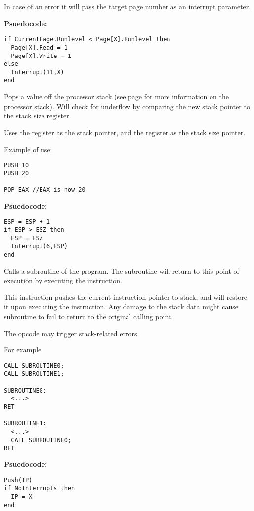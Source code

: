 
\intrpriv

In case of an error it will pass the target page number as an interrupt parameter.

\textbf{Psuedocode:}
\begin{verbatim}
if CurrentPage.Runlevel < Page[X].Runlevel then
  Page[X].Read = 1
  Page[X].Write = 1
else
  Interrupt(11,X)
end
\end{verbatim}


Pops a value off the processor stack (see page \pageref{stack} for more information on the processor stack). Will check for underflow by comparing the new stack pointer to the stack size register.

Uses the  register as the stack pointer, and the  register as the stack size pointer.

Example of use:
\begin{verbatim}
PUSH 10
PUSH 20

POP EAX //EAX is now 20
\end{verbatim}


\textbf{Psuedocode:}
\begin{verbatim}
ESP = ESP + 1
if ESP > ESZ then
  ESP = ESZ
  Interrupt(6,ESP)
end
\end{verbatim}


Calls a subroutine of the program. The subroutine will return to this point of execution by executing the  instruction.

This instruction pushes the current instruction pointer to stack, and will restore it upon executing the  instruction. Any damage to the stack data might cause subroutine to fail to return to the original calling point.

The opcode may trigger stack-related errors.

For example:
\begin{verbatim}
CALL SUBROUTINE0;
CALL SUBROUTINE1;

SUBROUTINE0:
  <...>
RET

SUBROUTINE1:
  <...>
  CALL SUBROUTINE0;
RET
\end{verbatim}


\textbf{Psuedocode:}
\begin{verbatim}
Push(IP)
if NoInterrupts then
  IP = X
end
\end{verbatim}


